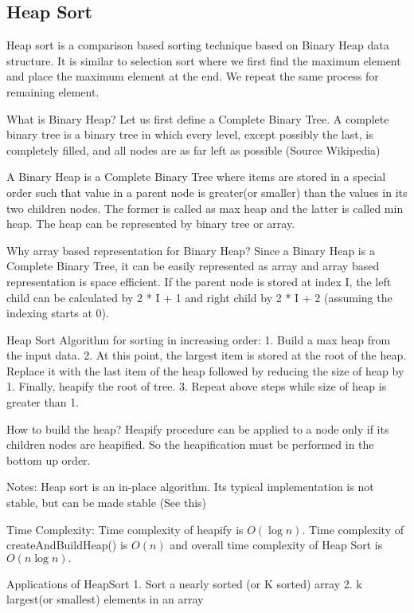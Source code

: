\documentclass{article}
\begin{document}
\subsection{Heap Sort}

Heap sort is a comparison based sorting technique based on Binary Heap data structure. It is similar to selection sort where we first find the maximum element and place the maximum element at the end. We repeat the same process for remaining element.

What is Binary Heap?
Let us first define a Complete Binary Tree. A complete binary tree is a binary tree in which every level, except possibly the last, is completely filled, and all nodes are as far left as possible (Source Wikipedia)

A Binary Heap is a Complete Binary Tree where items are stored in a special order such that value in a parent node is greater(or smaller) than the values in its two children nodes. The former is called as max heap and the latter is called min heap. The heap can be represented by binary tree or array.



Why array based representation for Binary Heap?
Since a Binary Heap is a Complete Binary Tree, it can be easily represented as array and array based representation is space efficient. If the parent node is stored at index I, the left child can be calculated by 2 * I + 1 and right child by 2 * I + 2 (assuming the indexing starts at 0).

Heap Sort Algorithm for sorting in increasing order:
1. Build a max heap from the input data.
2. At this point, the largest item is stored at the root of the heap. Replace it with the last item of the heap followed by reducing the size of heap by 1. Finally, heapify the root of tree.
3. Repeat above steps while size of heap is greater than 1.

How to build the heap?
Heapify procedure can be applied to a node only if its children nodes are heapified. So the heapification must be performed in the bottom up order.



Notes:
Heap sort is an in-place algorithm.
Its typical implementation is not stable, but can be made stable (See this)

Time Complexity: Time complexity of heapify is $O(\log n)$. Time complexity of createAndBuildHeap() is $O(n)$ and overall time complexity of Heap Sort is $O(n\log n).$

Applications of HeapSort
1. Sort a nearly sorted (or K sorted) array
2. k largest(or smallest) elements in an array
\end{document}

